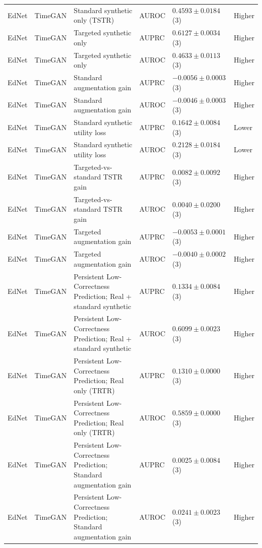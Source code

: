 \begin{longtable}{@{}p{2.25cm}p{2.05cm}p{4.7cm}p{5.0cm}p{2.6cm}p{1.25cm}@{}}
EdNet & TimeGAN & Standard synthetic only (TSTR) & AUROC & $0.4593 \mathbin{\pm} 0.0184$ (3) & Higher \\
EdNet & TimeGAN & Targeted synthetic only & AUPRC & $0.6127 \mathbin{\pm} 0.0034$ (3) & Higher \\
EdNet & TimeGAN & Targeted synthetic only & AUROC & $0.4633 \mathbin{\pm} 0.0113$ (3) & Higher \\
EdNet & TimeGAN & Standard augmentation gain & AUPRC & $-0.0056 \mathbin{\pm} 0.0003$ (3) & Higher \\
EdNet & TimeGAN & Standard augmentation gain & AUROC & $-0.0046 \mathbin{\pm} 0.0003$ (3) & Higher \\
EdNet & TimeGAN & Standard synthetic utility loss & AUPRC & $0.1642 \mathbin{\pm} 0.0084$ (3) & Lower \\
EdNet & TimeGAN & Standard synthetic utility loss & AUROC & $0.2128 \mathbin{\pm} 0.0184$ (3) & Lower \\
EdNet & TimeGAN & Targeted-vs-standard TSTR gain & AUPRC & $0.0082 \mathbin{\pm} 0.0092$ (3) & Higher \\
EdNet & TimeGAN & Targeted-vs-standard TSTR gain & AUROC & $0.0040 \mathbin{\pm} 0.0200$ (3) & Higher \\
EdNet & TimeGAN & Targeted augmentation gain & AUPRC & $-0.0053 \mathbin{\pm} 0.0001$ (3) & Higher \\
EdNet & TimeGAN & Targeted augmentation gain & AUROC & $-0.0040 \mathbin{\pm} 0.0002$ (3) & Higher \\
EdNet & TimeGAN & Persistent Low-Correctness Prediction; Real + standard synthetic & AUPRC & $0.1334 \mathbin{\pm} 0.0084$ (3) & Higher \\
EdNet & TimeGAN & Persistent Low-Correctness Prediction; Real + standard synthetic & AUROC & $0.6099 \mathbin{\pm} 0.0023$ (3) & Higher \\
EdNet & TimeGAN & Persistent Low-Correctness Prediction; Real only (TRTR) & AUPRC & $0.1310 \mathbin{\pm} 0.0000$ (3) & Higher \\
EdNet & TimeGAN & Persistent Low-Correctness Prediction; Real only (TRTR) & AUROC & $0.5859 \mathbin{\pm} 0.0000$ (3) & Higher \\
EdNet & TimeGAN & Persistent Low-Correctness Prediction; Standard augmentation gain & AUPRC & $0.0025 \mathbin{\pm} 0.0084$ (3) & Higher \\
EdNet & TimeGAN & Persistent Low-Correctness Prediction; Standard augmentation gain & AUROC & $0.0241 \mathbin{\pm} 0.0023$ (3) & Higher \\

\end{longtable}
